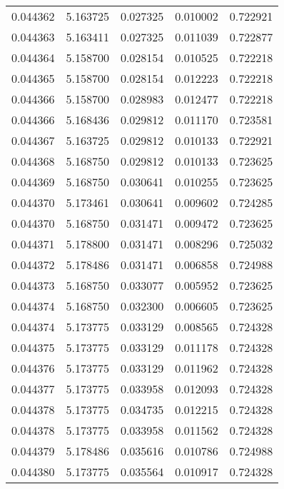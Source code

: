 \begin{tabular}{lrrrr}
0.044362    &  5.163725 &  0.027325 &  0.010002 &             0.722921 \\
0.044363    &  5.163411 &  0.027325 &  0.011039 &             0.722877 \\
0.044364    &  5.158700 &  0.028154 &  0.010525 &             0.722218 \\
0.044365    &  5.158700 &  0.028154 &  0.012223 &             0.722218 \\
0.044366    &  5.158700 &  0.028983 &  0.012477 &             0.722218 \\
0.044366    &  5.168436 &  0.029812 &  0.011170 &             0.723581 \\
0.044367    &  5.163725 &  0.029812 &  0.010133 &             0.722921 \\
0.044368    &  5.168750 &  0.029812 &  0.010133 &             0.723625 \\
0.044369    &  5.168750 &  0.030641 &  0.010255 &             0.723625 \\
0.044370    &  5.173461 &  0.030641 &  0.009602 &             0.724285 \\
0.044370    &  5.168750 &  0.031471 &  0.009472 &             0.723625 \\
0.044371    &  5.178800 &  0.031471 &  0.008296 &             0.725032 \\
0.044372    &  5.178486 &  0.031471 &  0.006858 &             0.724988 \\
0.044373    &  5.168750 &  0.033077 &  0.005952 &             0.723625 \\
0.044374    &  5.168750 &  0.032300 &  0.006605 &             0.723625 \\
0.044374    &  5.173775 &  0.033129 &  0.008565 &             0.724328 \\
0.044375    &  5.173775 &  0.033129 &  0.011178 &             0.724328 \\
0.044376    &  5.173775 &  0.033129 &  0.011962 &             0.724328 \\
0.044377    &  5.173775 &  0.033958 &  0.012093 &             0.724328 \\
0.044378    &  5.173775 &  0.034735 &  0.012215 &             0.724328 \\
0.044378    &  5.173775 &  0.033958 &  0.011562 &             0.724328 \\
0.044379    &  5.178486 &  0.035616 &  0.010786 &             0.724988 \\
0.044380    &  5.173775 &  0.035564 &  0.010917 &             0.724328 \\

\end{tabular}
